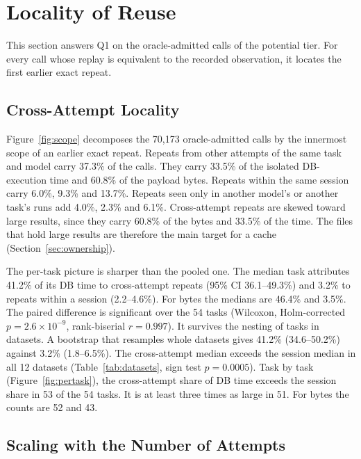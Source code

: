 \section{Locality of Reuse}
\label{sec:locality}

This section answers Q1 on the oracle-admitted calls of the potential tier. For every call whose replay is
equivalent to the recorded observation, it locates the first earlier exact repeat.

\subsection{Cross-Attempt Locality}
\label{sec:scope}

Figure~\ref{fig:scope} decomposes the 70,173 oracle-admitted calls by the innermost scope of an earlier exact repeat.
Repeats from other attempts of the same task and model carry 37.3\% of the calls. They carry 33.5\% of the isolated DB-execution time and 60.8\% of the payload bytes. Repeats within the same session carry 6.0\%, 9.3\% and 13.7\%.
Repeats seen only in another model's or another task's runs add 4.0\%, 2.3\% and 6.1\%. Cross-attempt repeats are
skewed toward large results, since they carry 60.8\% of the bytes and 33.5\% of the time. The files that hold large
results are therefore the main target for a cache (Section~\ref{sec:ownership}).

The per-task picture is sharper than the pooled one. The median task attributes 41.2\% of its DB time to
cross-attempt repeats (95\% CI 36.1--49.3\%) and 3.2\% to repeats within a session (2.2--4.6\%). For bytes the
medians are 46.4\% and 3.5\%. The paired difference is significant over the 54 tasks (Wilcoxon, Holm-corrected
$p=2.6\times10^{-9}$, rank-biserial $r=0.997$). It survives the nesting of tasks in datasets. A bootstrap that
resamples whole datasets gives 41.2\% (34.6--50.2\%) against 3.2\% (1.8--6.5\%). The cross-attempt median exceeds the
session median in all 12 datasets (Table~\ref{tab:datasets}, sign test $p=0.0005$). Task by task
(Figure~\ref{fig:pertask}), the cross-attempt share of DB time exceeds the session share in 53 of the 54 tasks. It is
at least three times as large in 51. For bytes the counts are 52 and 43.

\subsection{Scaling with the Number of Attempts}
\label{sec:growth}

